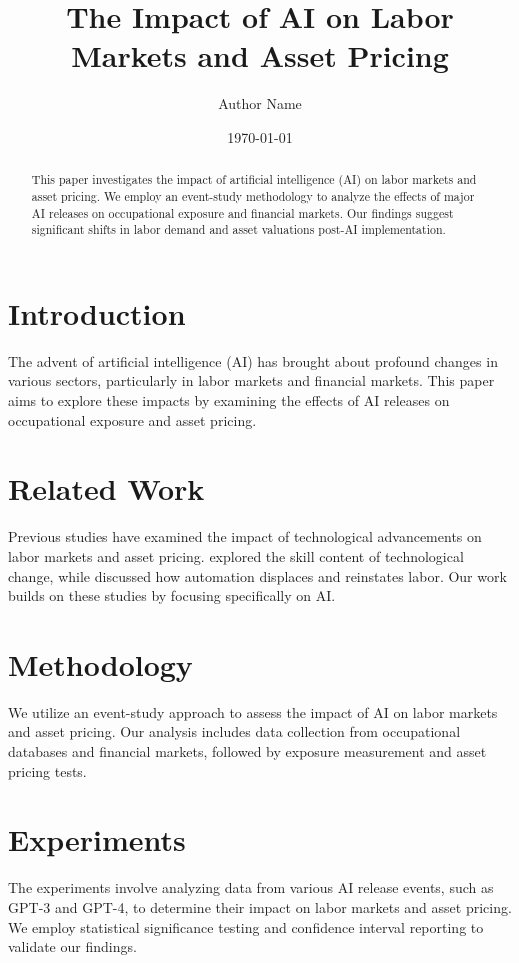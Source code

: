 \documentclass{article}
\begin{document}
\title{The Impact of AI on Labor Markets and Asset Pricing}
\author{Author Name}
\date{\today}

\maketitle

\begin{abstract}
This paper investigates the impact of artificial intelligence (AI) on labor markets and asset pricing. We employ an event-study methodology to analyze the effects of major AI releases on occupational exposure and financial markets. Our findings suggest significant shifts in labor demand and asset valuations post-AI implementation.
\end{abstract}

\section{Introduction}
The advent of artificial intelligence (AI) has brought about profound changes in various sectors, particularly in labor markets and financial markets. This paper aims to explore these impacts by examining the effects of AI releases on occupational exposure and asset pricing.

\section{Related Work}
Previous studies have examined the impact of technological advancements on labor markets and asset pricing. \cite{Autor2003} explored the skill content of technological change, while \cite{AcemogluRestrepo2019} discussed how automation displaces and reinstates labor. Our work builds on these studies by focusing specifically on AI.

\section{Methodology}
We utilize an event-study approach to assess the impact of AI on labor markets and asset pricing. Our analysis includes data collection from occupational databases and financial markets, followed by exposure measurement and asset pricing tests.

\section{Experiments}
The experiments involve analyzing data from various AI release events, such as GPT-3 and GPT-4, to determine their impact on labor markets and asset pricing. We employ statistical significance testing and confidence interval reporting to validate our findings.
\end{document}
